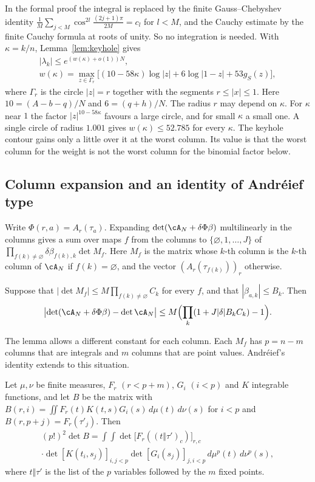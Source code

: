 In the formal proof the integral is replaced by the finite Gauss--Chebyshev identity
$\frac1M\sum_{j<M}\cos^{2l}\frac{(2j+1)\pi}{2M}=c_l$ for $l<M$, and the Cauchy estimate by the finite Cauchy
formula at roots of unity. So no integration is needed. With $\kappa=k/n$, Lemma~\ref{lem:keyhole} gives
\begin{equation}\label{eq:wk}
\begin{gathered}
 |\lambda_k|\le e^{(w(\kappa)+o(1))N},\\
 w(\kappa)=\max_{z\in\Gamma_r}\bigl[(10-58\kappa)\log|z|+6\log|1-z|+53g_S(z)\bigr],
\end{gathered}
\end{equation}
where $\Gamma_r$ is the circle $|z|=r$ together with the segments $r\le|x|\le1$. Here $10=(A-b-q)/N$ and
$6=(q+h)/N$. The radius $r$ may depend on $\kappa$. For $\kappa$ near $1$ the factor $|z|^{10-58\kappa}$
favours a large circle, and for small $\kappa$ a small one. A single circle of radius $1.001$ gives
$w(\kappa)\le52.785$ for every $\kappa$. The keyhole contour gains only a little over it at the worst
column. Its value is that the worst column for the weight is not the worst column for the binomial factor
below.

\subsection{Column expansion and an identity of Andr\'eief type}\label{ssec:andreief}
Write $\Phi(r,a)=A_r(\tau_a)$. Expanding $\det(\cA_N+\delta\Phi\beta)$ multilinearly in the columns gives a
sum over maps $f$ from the columns to $\{\varnothing,1,\ldots,J\}$ of
$\prod_{f(k)\ne\varnothing}\delta\beta_{f(k),k}\det M_f$. Here $M_f$ is the matrix whose $k$-th column is the
$k$-th column of $\cA_N$ if $f(k)=\varnothing$, and the vector $(A_r(\tau_{f(k)}))_r$ otherwise.

\begin{lemma}\label{lem:expansion}
Suppose that $|\det M_f|\le M\prod_{f(k)\ne\varnothing}C_k$ for every $f$, and that $|\beta_{a,k}|\le B_k$. Then
\[
 \bigl|\det(\cA_N+\delta\Phi\beta)-\det\cA_N\bigr|\le M\Bigl(\prod_k(1+J|\delta|B_kC_k)-1\Bigr).
\]
\end{lemma}

The lemma allows a different constant for each column. Each $M_f$ has $p=n-m$ columns that are integrals and
$m$ columns that are point values. Andr\'eief's identity extends to this situation.

\begin{lemma}\label{lem:andreief}
Let $\mu,\nu$ be finite measures, $F_r$ $(r<p+m)$, $G_i$ $(i<p)$ and $K$ integrable functions, and let $B$
be the matrix with $B(r,i)=\iint F_r(t)K(t,s)G_i(s)\,d\mu(t)\,d\nu(s)$ for $i<p$ and
$B(r,p+j)=F_r(\tau'_j)$. Then
\begin{multline*}
 (p!)^2\det B=\int\!\!\int\det\bigl[F_r((t\Vert\tau')_c)\bigr]_{r,c}\\
 \cdot\det[K(t_i,s_j)]_{i,j<p}\det[G_i(s_j)]_{j,i<p}\,d\mu^p(t)\,d\nu^p(s),
\end{multline*}
where $t\Vert\tau'$ is the list of the $p$ variables followed by the $m$ fixed points.
\end{lemma}

